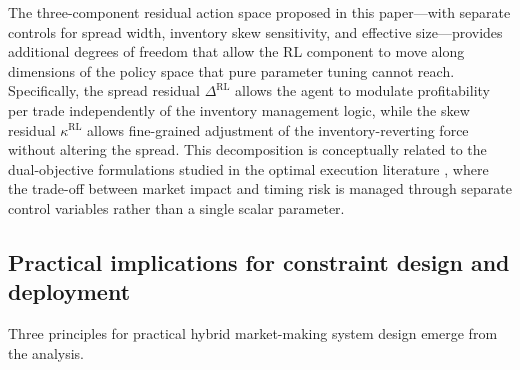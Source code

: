 \documentclass[11pt]{article}
\begin{document}
The three-component residual action space proposed in this paper---with
separate controls for spread width, inventory skew sensitivity, and
effective size---provides additional degrees of freedom that allow
the RL component to move along dimensions of the policy space that pure
parameter tuning cannot reach.
Specifically, the spread residual $\Delta^{\text{RL}}$ allows the agent
to modulate profitability per trade independently of the inventory
management logic, while the skew residual $\kappa^{\text{RL}}$ allows
fine-grained adjustment of the inventory-reverting force without
altering the spread.
This decomposition is conceptually related to the dual-objective
formulations studied in the optimal execution literature
\parencite{almgren2001optimal}, where the trade-off between market
impact and timing risk is managed through separate control variables
rather than a single scalar parameter.

\subsection{Practical implications for constraint design and deployment}

Three principles for practical hybrid market-making system design emerge
from the analysis.
\end{document}
